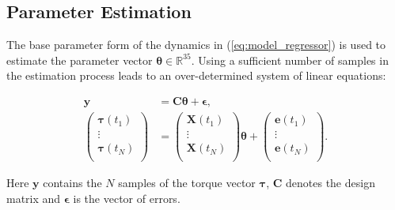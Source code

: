 
\subsection{Parameter Estimation}
\label{subsec:ParameterEstimation}

The base parameter form of the dynamics in (\ref{eq:model_regressor}) is used to estimate
the parameter vector $\boldsymbol{\theta} \in \mathbb{R}^{35}$.
%
Using a sufficient number of samples in the estimation process leads to an over-determined system of linear equations:

\begin{equation} \label{eq:ParameterEstimation_problem}
\begin{aligned}
    \boldsymbol{y} &= \boldsymbol{C} \boldsymbol{\theta} + \boldsymbol{\epsilon}, \\
    \begin{pmatrix}
        \boldsymbol{\tau}(t_1) \\
        \vdots \\
        \boldsymbol{\tau}(t_N) \\
    \end{pmatrix} &= 
    \begin{pmatrix}
        \boldsymbol{X}(t_1) \\
        \vdots \\
        \boldsymbol{X}(t_N) \\
    \end{pmatrix} \boldsymbol{\theta} +
    \begin{pmatrix}
        \boldsymbol{e}(t_1) \\
        \vdots \\
        \boldsymbol{e}(t_N) \\
    \end{pmatrix}.
\end{aligned}
\end{equation}

Here $\boldsymbol{y}$ contains the $N$ samples of the torque vector $\boldsymbol{\tau}$, $\boldsymbol{C}$ denotes the design matrix and $\boldsymbol{\epsilon}$ is the vector of errors.

